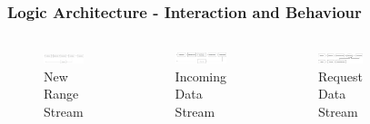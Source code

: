 \documentclass{beamer}
\begin{document}
\begin{frame}
  \frametitle{Logic Architecture - Interaction and Behaviour}
  \begin{columns}[c] %
    \begin{figure}
      \includegraphics[width=\linewidth]{../../Docs/ProjectReport/Figures/LogicArchitecture/Server/FlowDiagramNewRange.png}
      \caption{New Range Stream}
    \end{figure}
    \begin{figure}
      \includegraphics[width=\linewidth]{../../Docs/ProjectReport/Figures/LogicArchitecture/Server/FlowDiagramReceiveData.png}
      \caption{Incoming Data Stream}
    \end{figure}
    \begin{figure}
      \includegraphics[width=\linewidth]{../../Docs/ProjectReport/Figures/LogicArchitecture/Server/FlowDiagramViewData.png}
      \caption{Request Data Stream}
    \end{figure}
      \begin{figure}
        \includegraphics[width=\linewidth]{../../Docs/ProjectReport/Figures/LogicArchitecture/Server/IPersistenceStoreBehavior.png}

\end{figure}
\end{columns}
\end{frame}
\end{document}
